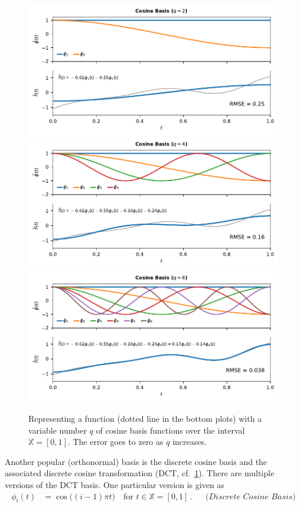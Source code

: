 \documentclass[10pt,letterpaper,oneside]{article}
\begin{document}
\begin{figure}[p]
	\centering
	\includegraphics[scale=0.95]{media/cosine_q2.pdf}
	\includegraphics[scale=0.95]{media/cosine_q4.pdf}
	\includegraphics[scale=0.95]{media/cosine_q6.pdf}
	\caption{Representing a function (dotted line in the bottom plots) with a variable number $q$ of cosine basis functions over the interval $\mathbb{X} = [0, 1]$. The error goes to zero as $q$ increases.}
	\label{fig:cosine}
\end{figure}
Another popular (orthonormal) basis is the discrete cosine basis and the associated discrete cosine transformation (DCT, cf.~\cref{fig:cosine}). There are multiple versions of the DCT basis. One particular version is given as
\begin{align*}
	\phi_i(t) &= \cos\big( (i - 1) \pi t \big) \quad \text{for } t \in \mathbb{X} = [0, 1] \,. && \textit{(Discrete Cosine Basis)}
\end{align*}
\end{document}
